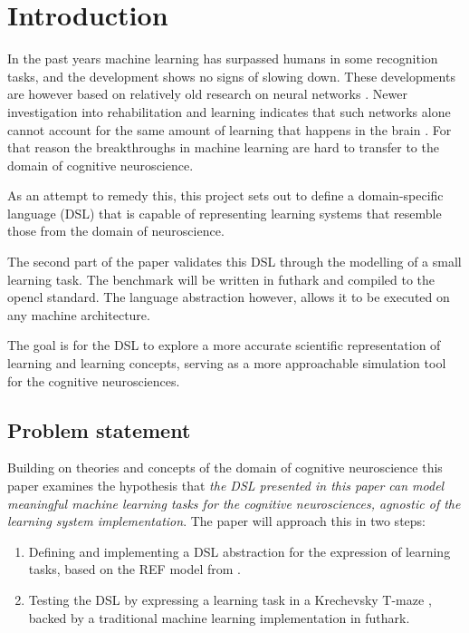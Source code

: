 \documentclass[a4paper,oneside]{memoir}
\begin{document}
\mainmatter
\chapter{Introduction}
In the past years machine learning has surpassed humans in some recognition
tasks, and the development shows no signs of slowing down.
These developments are however based on relatively old research on neural
networks \autocite{Nilsson2009, russel2007}.
Newer investigation into rehabilitation and learning indicates that such
networks alone cannot account for the same amount of learning that happens
in the brain \autocite{Mogensen2011, block2007, russel2007, Moravec98, dennett2017}.
For that reason the breakthroughs in machine learning are hard to transfer
to the domain of cognitive neuroscience.

As an attempt to remedy this, this project sets out to define a domain-specific
language (DSL) that is capable of representing learning systems that resemble
those from the domain of neuroscience.

The second part of the paper validates this DSL through the modelling of a small
learning task. The benchmark will be written in \gls{futhark} and compiled to
the \gls{opencl} standard. The language abstraction however, allows it to be
executed on any machine architecture.

The goal is for the DSL to explore a more accurate scientific representation of
learning and learning concepts, serving as a more approachable simulation tool
for the cognitive neurosciences.

\section{Problem statement}
Building on theories and concepts of the domain of cognitive neuroscience
this paper examines the hypothesis that
\textit{
  the DSL presented in this paper can model meaningful machine learning
  tasks for the cognitive neurosciences,
  agnostic of the learning system implementation}.
The paper will approach this in two steps:

\begin{enumerate}
  \item Defining and implementing a DSL abstraction for the expression of
        learning tasks, based on the REF model from \autocite{Mogensen2011}.
  \item Testing the DSL by expressing a learning task in a Krechevsky
        T-maze \autocite{Krechevsky1932}, backed by a traditional machine
        learning implementation in \gls{futhark}.
\end{enumerate}
%
\end{document}
